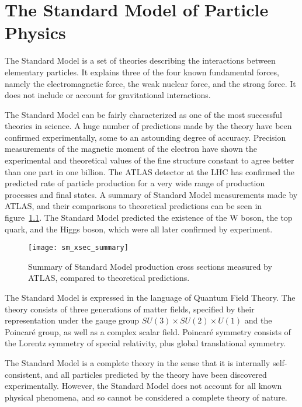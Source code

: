 \chapter{The Standard Model of Particle Physics}\label{ch:sm}

The Standard Model is a set of theories describing the interactions between elementary particles.
It explains three of the four known fundamental forces, namely the electromagnetic force,
the weak nuclear force, and the strong force.
It does not include  or account for gravitational interactions.

The Standard Model can be fairly characterized as one of the most successful theories in science.
A huge number of predictions made by the theory have been confirmed experimentally,
some to an astounding degree of accuracy.
Precision measurements of the magnetic moment of the electron have shown the experimental and theoretical values of the
fine structure constant to agree better than one part in one billion.\cite{sm-fine-structure-2008}
The ATLAS detector at the LHC has confirmed the predicted rate of particle production for a very wide range of
production processes and final states.
A summary of Standard Model measurements made by ATLAS, and their comparisons to theoretical predictions can be seen in figure~\ref{fig:sm_xsec_summary}.
The Standard Model predicted the existence of the W boson, the top quark, and the Higgs boson,
which were all later confirmed by experiment.

\begin{figure}[!ht]
    \centering
\texttt{[image: sm\_xsec\_summary]}
\caption{Summary of Standard Model production cross sections measured by ATLAS, compared to theoretical predictions.}
\label{fig:sm_xsec_summary}
\end{figure}

The Standard Model is expressed in the language of Quantum Field Theory.
The theory consists of three generations of matter fields,
specified by their representation under the gauge group $SU(3)\times SU(2)\times U(1)$ and the Poincar\'e group,
as well as a complex scalar field.
Poincar\'e symmetry consists of the Lorentz symmetry of special relativity, plus global translational symmetry.

The Standard Model is a complete theory in the sense that it is internally self-consistent,
and all particles predicted by the theory have been discovered experimentally.
However, the Standard Model does not account for all known physical phenomena,
and so cannot be considered a complete theory of nature.

